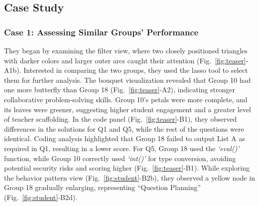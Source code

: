 \subsection{Case Study}
\label{case}
\subsubsection{Case 1: Assessing Similar Groups' Performance}
They began by examining the filter view, where two closely positioned triangles with darker colors and larger outer arcs caught their attention (Fig.~\ref{fig:teaser}-A1b). 
Interested in comparing the two groups, they used the lasso tool to select them for further analysis.
The bouquet visualization revealed that Group 10 had one more butterfly than Group 18 (Fig.~\ref{fig:teaser}-A2), indicating stronger collaborative problem-solving skills.
Group 10's petals were more complete, and its leaves were greener, suggesting higher student engagement and a greater level of teacher scaffolding. 
In the code panel (Fig.~\ref{fig:teaser}-B1), they observed differences in the solutions for Q1 and Q5, while the rest of the questions were identical.
Coding analysis highlighted that Group 18 failed to output List A as required in Q1, resulting in a lower score.
For Q5, Group 18 used the \textit{`eval()'} function, while Group 10 correctly used \textit{`int()'} for type conversion, avoiding potential security risks and scoring higher (Fig.~\ref{fig:teaser}-B1).
While exploring the behavior pattern view (Fig.~\ref{fig:student}-B2b), they observed a yellow node in Group 18 gradually enlarging, representing ``Question Planning'' (Fig.~\ref{fig:student}-B2d).
